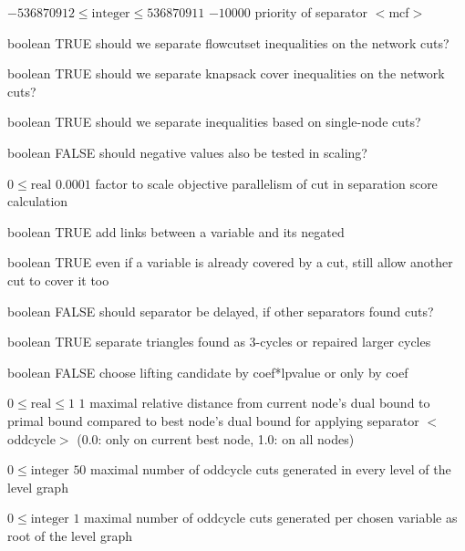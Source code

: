 %
{$-536870912\leq\textrm{integer}\leq536870911$}%
{$-10000$}%
{priority of separator $<$mcf$>$}%
{}

%
{boolean}%
{TRUE}%
{should we separate flowcutset inequalities on the network cuts?}%
{}

%
{boolean}%
{TRUE}%
{should we separate knapsack cover inequalities on the network cuts?}%
{}

%
{boolean}%
{TRUE}%
{should we separate inequalities based on single-node cuts?}%
{}

%
{boolean}%
{FALSE}%
{should negative values also be tested in scaling?}%
{}

%
{$0\leq\textrm{real}$}%
{$0.0001$}%
{factor to scale objective parallelism of cut in separation score calculation}%
{}

%
{boolean}%
{TRUE}%
{add links between a variable and its negated}%
{}

%
{boolean}%
{TRUE}%
{even if a variable is already covered by a cut, still allow another cut to cover it too}%
{}

%
{boolean}%
{FALSE}%
{should separator be delayed, if other separators found cuts?}%
{}

%
{boolean}%
{TRUE}%
{separate triangles found as 3-cycles or repaired larger cycles}%
{}

%
{boolean}%
{FALSE}%
{choose lifting candidate by coef*lpvalue or only by coef}%
{}

%
{$0\leq\textrm{real}\leq1$}%
{$1$}%
{maximal relative distance from current node's dual bound to primal bound compared to best node's dual bound for applying separator $<$oddcycle$>$ (0.0: only on current best node, 1.0: on all nodes)}%
{}

%
{$0\leq\textrm{integer}$}%
{$50$}%
{maximal number of oddcycle cuts generated in every level of the level graph}%
{}

%
{$0\leq\textrm{integer}$}%
{$1$}%
{maximal number of oddcycle cuts generated per chosen variable as root of the level graph}%
{}

